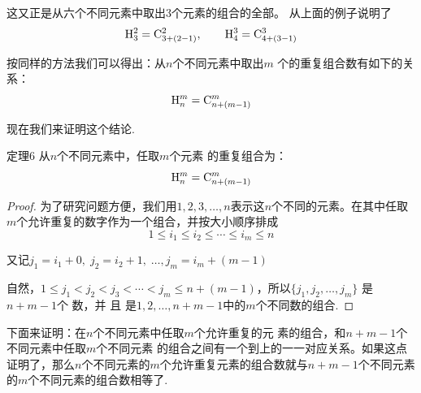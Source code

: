 这又正是从六个不同元素中取出3个元素的组合的全部。
从上面的例子说明了
\[{\rm H}_{3}^{2}= {\rm C}_{3+ ( 2- 1) }^{2}, \qquad {\rm H}_{4}^{3}={\rm C}_{4+ ( 3- 1) }^3\]

按同样的方法我们可以得出：从$n$个不同元素中取出$m$
个的重复组合数有如下的关系：
$${\rm H}_{n}^{m}= {\rm C}^m_{n+ ( m- 1) }$$

现在我们来证明这个结论.

\begin{blk}
 {定理6} 从$n$个不同元素中，任取$m$个元素 的重复组合为：
 $${\rm H}_{n}^{m}={\rm C}_{n+ ( m-1) }^{m}$$ 
\end{blk}

\begin{proof}
    为了研究问题方便，我们用$1,2,3,\ldots,n$表示这$n$个不同的元素。在其中任取$m$个允许重复的数字作为一个组合，并按大小顺序排成
$$1\le i_1\le i_2\le\cdots\le i_m\le n$$

    又记$j_1=i_1+0,\; j_{2}=i_{2}+1,\;\ldots, j_{m}=i_{m}+(m-1)$
    
    自然，$1\le j_1<j_2<j_3<\cdots<j_m\leq n+(m-1)$，所以$\{j_1,j_2,\ldots,j_m\}$ 是$n+ m- 1$个 数，并 且 是$1, 2, \ldots , n+m-1$中的$m$个不同数的组合.
\end{proof}

下面来证明：在$n$个不同元素中任取$m$个允许重复的元
素的组合，和$n+m-1$个不同元素中任取$m$个不同元素 的组合之间有一个到上的一一对应关系。如果这点证明了，那么$n$个不同元素的$m$个允许重复元素的组合数就与$n+m-1$个不同元素的$m$个不同元素的组合数相等了.

